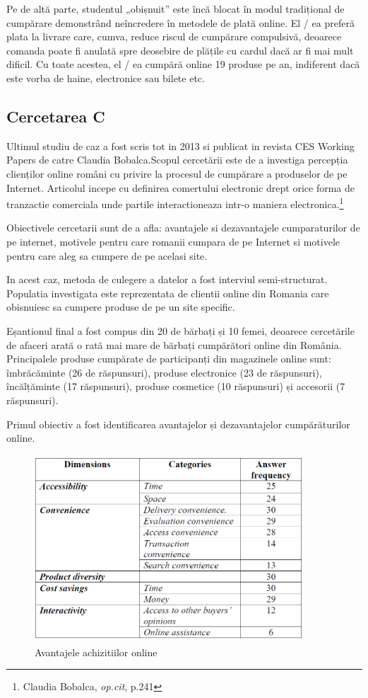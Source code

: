\documentclass[a4paper, 12pt]{article}
\begin{document}
		\quad Pe de altă parte, studentul „obișnuit” este încă blocat în modul tradițional de cumpărare demonstrând neîncredere în metodele de plată online. El / ea preferă plata la livrare care, cumva,  reduce riscul de cumpărare compulsivă, deoarece comanda poate fi anulată spre deosebire de plățile cu cardul dacă ar fi mai mult dificil. Cu toate acestea, el / ea cumpără online 19 produse pe an, indiferent dacă este vorba de haine, electronice sau bilete etc.
		\subsection{Cercetarea C}
		\qquad Ultimul studiu de caz  a fost scris tot in 2013 si publicat in revista CES Working Papers de catre Claudia Bobalca.Scopul cercetării este de a investiga percepția clienților online români cu privire la procesul de cumpărare a produselor de pe Internet. Articolul incepe cu definirea comertului electronic drept orice forma de tranzactie comerciala unde partile interactioneaza intr-o maniera electronica.\footnote{Claudia Bobalca, \textit{op.cit}, p.241}
		
		\quad Obiectivele cercetarii sunt de a afla: avantajele si dezavantajele cumparaturilor de pe internet, motivele pentru care romanii cumpara de pe Internet si motivele pentru care aleg sa cumpere de pe acelasi site.
		
		\quad In acest caz, metoda de culegere a datelor a fost interviul semi-structurat. Populatia investigata este reprezentata de clientii online din Romania care obisnuiesc sa cumpere produse de pe un site specific. 
		
		\quad Eșantionul final a fost compus din 20 de bărbați și 10 femei, deoarece cercetările de afaceri arată o rată mai mare de bărbați cumpărători online din România. Principalele produse cumpărate de participanți din magazinele online sunt: îmbrăcăminte (26 de răspunsuri), produse electronice (23 de răspunsuri), încălțăminte (17 răspunsuri), produse cosmetice (10 răspunsuri) și accesorii (7 răspunsuri).
		
		\quad Primul obiectiv a fost identificarea avantajelor și dezavantajelor cumpărăturilor online. 
		\begin{figure}[!htb]
			\centering
			\includegraphics[width=10cm, height=7cm]{"figures/zece.png"}
			\caption{Avantajele achizitiilor online}\label{fig:zece}
		\end{figure}
	
\end{document}
